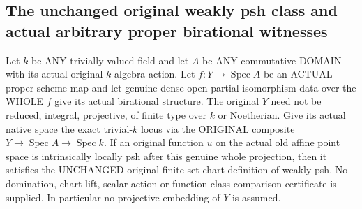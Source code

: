 \subsection{The unchanged original weakly psh class and actual arbitrary proper birational witnesses}

\begin{theorem}
\label{paper:actual-proper-birational-weakly-psh-converse}
\leanok
{}
Let $k$ be ANY trivially valued field and let $A$ be ANY commutative DOMAIN
with its actual original $k$-algebra action. Let $f:Y\to\operatorname{Spec}A$
be an ACTUAL proper scheme map and let genuine dense-open partial-isomorphism
data over the WHOLE $f$ give its actual birational structure. The original $Y$
need not be reduced, integral, projective, of finite type over $k$ or Noetherian.
Give its actual native space the exact trivial-$k$ locus via the ORIGINAL
composite $Y\to\operatorname{Spec}A\to\operatorname{Spec}k$.
If an original function $u$ on the actual old affine point space is intrinsically
locally psh after this genuine whole projection, then it satisfies the
UNCHANGED original finite-set chart definition of weakly psh.
No domination, chart lift, scalar action or function-class comparison
certificate is supplied. In particular no projective embedding of $Y$ is assumed.
\end{theorem}
